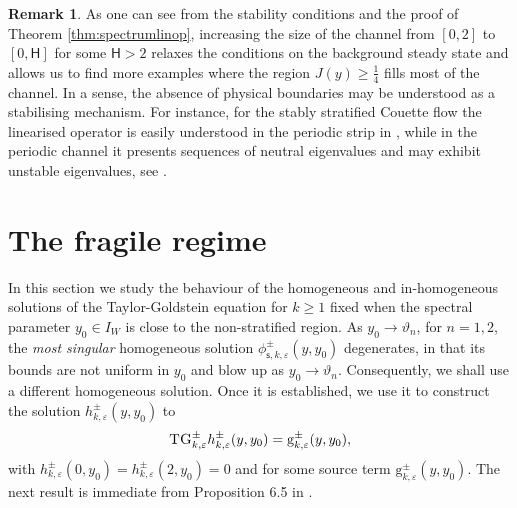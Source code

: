\documentclass[11pt,reqno]{amsproc}
\theoremstyle{definition}
\newtheorem{remark}[proposition]{Remark}
\numberwithin{equation}{section}
\newcommand{\s}{{\mathsf{s}}}
\newcommand{\ep}{\varepsilon}
\begin{document}
\begin{remark}
As one can see from the stability conditions and the proof of Theorem \ref{thm:spectrumlinop}, increasing the size of the channel from $[0,2]$ to $[0,\mathsf H]$ for some $\mathsf H>2$ relaxes the conditions on the background steady state and allows us to find more examples  where the region $J(y) \geq \frac14$ fills most of the channel. In a sense, the absence of physical boundaries may be understood as a stabilising mechanism. For instance, for the stably stratified Couette flow the linearised operator is easily understood in the periodic strip in \cite{CZN23strip}, while in the periodic channel it presents sequences of neutral eigenvalues and may exhibit unstable eigenvalues, see \cite{CZN25chan}.
\end{remark}


\section{The fragile regime}\label{sec:fragile}
In this section we study the behaviour of the homogeneous and in-homogeneous solutions of the Taylor-Goldstein equation for $k\geq 1$ fixed when the spectral parameter $y_0\in I_W$ is close to the non-stratified region. As $y_0\rightarrow \vartheta_n$, for $n=1,2$, the \emph{most singular} homogeneous solution $\phi_{\s,k,\ep}^\pm(y,y_0)$ degenerates, in that its bounds are not uniform in $y_0$ and blow up as $y_0\rightarrow \vartheta_n$. Consequently, we shall use a different homogeneous solution. Once it is established, we use it to construct the solution $h_{k,\ep}^\pm(y,y_0)$ to 
\begin{equation}\label{eq:inhomTgeqhr}
\textsc{TG}_{k,\ep}^\pm h_{k,\ep}^\pm(y,y_0) = \mathrm{g}_{k,\ep}^\pm(y,y_0),
\end{equation}
with $h_{k,\ep}^\pm(0,y_0)=h_{k,\ep}^\pm(2,y_0)=0$ and for some source term $\mathrm{g}_{k,\ep}^\pm(y,y_0)$. The next result is immediate from Proposition 6.5 in \cite{WZZ18}.
\end{document}
